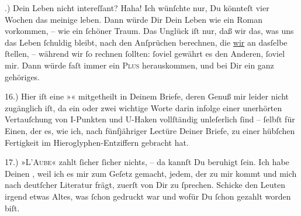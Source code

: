 .) Dein Leben nicht intereſſant? Haha! Ich wünſchte nur, Du könnteſt vier Wochen
               das  meinige leben. {\pb}Dann würde  Dir Dein Leben wie ein Roman vorkommen, – wie ein{ }ſchöner Traum. Das Unglück
               iſt nur, daß \strikeout{\textcolor{gray}{m}} wir das, was uns das Leben{ }ſchuldig bleibt, nach den Anſprüchen berechnen, die
                  \uline{wir} an dasſelbe{ }ſtellen, – während wir{ }ſo rechnen{ }ſollten:{ }ſoviel gewährt es den Anderen,{ }ſoviel mir. Dann würde faſt immer ein \textsc{Plus} herauskommen, und bei Dir ein ganz gehöriges.\pend
           
\pstart
           {\pb}16.) Hier iſt eine »\label{K_L02774-9v}\label{K_L02774-9}« mitgetheilt in Deinem Briefe, deren Genuß mir leider nicht zugänglich iſt,
               da ein oder zwei wichtige Worte darin infolge einer unerhörten Vertauſchung von
               I-Punkten und U-Haken vollſtändig unleſerlich{ }ſind –{ }ſelbſt für Einen, der  es, wie ich, nach fünfjähriger Lectüre
               Deiner Briefe, zu einer hübſchen Fertigkeit im Hieroglyphen-Entziffern gebracht
               hat.\pend
           
\pstart
           {\pb}17.) »\textsc{L’Aube}« zahlt{ }ſicher{ }ſicher nichts, – da kannſt Du beruhigt{ }ſein. Ich habe Deinen
                  \label{K_L02774-10v}\label{K_L02774-10}, weil ich es mir zum Geſetz \strikeout{\textcolor{gray}{ma}} gemacht, jedem, der zu mir kommt und mich nach deutſcher Literatur frägt,
               zuerſt von Dir zu{ }ſprechen. Schicke den Leuten irgend etwas Altes, was{ }ſchon gedruckt war und wofür
               Du{ }ſchon gezahlt worden biſt.\pend
           
